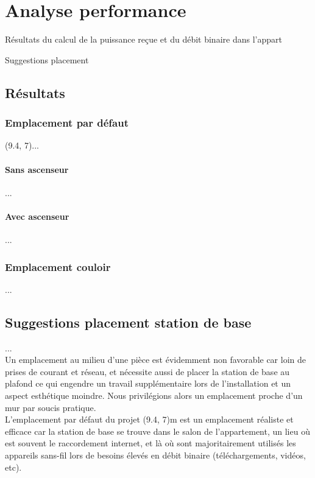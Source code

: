 \chapter{Analyse performance}
\label{chaper-4}

Résultats du calcul de la puissance reçue et du débit binaire dans l'appart

Suggestions placement


\section{Résultats}

\subsection{Emplacement par défaut}
(9.4, 7)...

\subsubsection{Sans ascenseur}
...
\subsubsection{Avec ascenseur}
...

\subsection{Emplacement couloir}
...


\section{Suggestions placement station de base}

...\\

Un emplacement au milieu d'une pièce est évidemment non favorable car loin de prises de courant et réseau, et nécessite aussi de placer la station de base au plafond ce qui engendre un travail supplémentaire lors de l'installation et un aspect esthétique moindre. Nous privilégions alors un emplacement proche d'un mur par soucis pratique.\\

L'emplacement par défaut du projet (9.4, 7)m est un emplacement réaliste et efficace car la station de base se trouve dans le salon de l'appartement, un lieu où est souvent le raccordement internet, et là où sont majoritairement utilisés les appareils sans-fil lors de besoins élevés en débit binaire (téléchargements, vidéos, etc).\\

